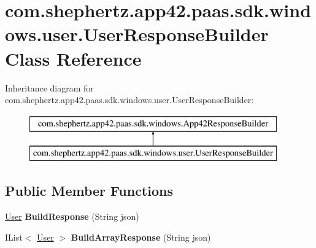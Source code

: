 \hypertarget{classcom_1_1shephertz_1_1app42_1_1paas_1_1sdk_1_1windows_1_1user_1_1_user_response_builder}{\section{com.\+shephertz.\+app42.\+paas.\+sdk.\+windows.\+user.\+User\+Response\+Builder Class Reference}
\label{classcom_1_1shephertz_1_1app42_1_1paas_1_1sdk_1_1windows_1_1user_1_1_user_response_builder}
}
Inheritance diagram for com.\+shephertz.\+app42.\+paas.\+sdk.\+windows.\+user.\+User\+Response\+Builder\+:\begin{figure}[H]
\begin{center}
\leavevmode
\includegraphics[height=2.000000cm]{classcom_1_1shephertz_1_1app42_1_1paas_1_1sdk_1_1windows_1_1user_1_1_user_response_builder}
\end{center}
\end{figure}
\subsection*{Public Member Functions}
\begin{DoxyCompactItemize}
\item 
\hypertarget{classcom_1_1shephertz_1_1app42_1_1paas_1_1sdk_1_1windows_1_1user_1_1_user_response_builder_aeba0b3a04ed434add60ca9d3da6dae3b}{\hyperlink{classcom_1_1shephertz_1_1app42_1_1paas_1_1sdk_1_1windows_1_1user_1_1_user}{User} {\bfseries Build\+Response} (String json)}\label{classcom_1_1shephertz_1_1app42_1_1paas_1_1sdk_1_1windows_1_1user_1_1_user_response_builder_aeba0b3a04ed434add60ca9d3da6dae3b}

\item 
\hypertarget{classcom_1_1shephertz_1_1app42_1_1paas_1_1sdk_1_1windows_1_1user_1_1_user_response_builder_adcae31c9741e5af1056327a8e79b0d79}{I\+List$<$ \hyperlink{classcom_1_1shephertz_1_1app42_1_1paas_1_1sdk_1_1windows_1_1user_1_1_user}{User} $>$ {\bfseries Build\+Array\+Response} (String json)}\label{classcom_1_1shephertz_1_1app42_1_1paas_1_1sdk_1_1windows_1_1user_1_1_user_response_builder_adcae31c9741e5af1056327a8e79b0d79}

\end{DoxyCompactItemize}
